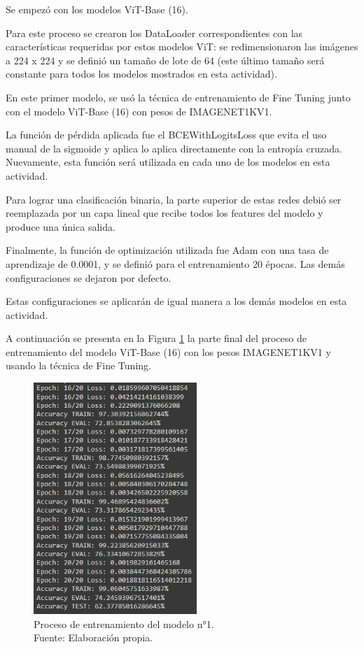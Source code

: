 Se empezó con los modelos ViT-Base (16).

Para este proceso se crearon los DataLoader correspondientes con las características requeridas por estos modelos ViT: se redimensionaron las imágenes a 224 x 224 y se definió un tamaño de lote de 64 (este último tamaño será constante para todos los modelos mostrados en esta actividad).

En este primer modelo, se usó la técnica de entrenamiento de Fine Tuning junto con el modelo ViT-Base (16) con pesos de IMAGENET1KV1.

La función de pérdida aplicada fue el BCEWithLogitsLoss que evita el uso manual de la sigmoide y aplica lo aplica directamente con la entropía cruzada. Nuevamente, esta función será utilizada en cada uno de los modelos en esta actividad.

Para lograr una clasificación binaria, la parte superior de estas redes debió ser reemplazada por un capa lineal que recibe todos los features del modelo y produce una única salida.

Finalmente, la función de optimización utilizada fue Adam con una tasa de aprendizaje de 0.0001, y se definió para el entrenamiento 20 épocas. Las demás configuraciones se dejaron por defecto.

Estas configuraciones se aplicarán de igual manera a los demás modelos en esta actividad.

A continuación se presenta en la Figura \ref{4:fig120} la parte final del proceso de entrenamiento del modelo ViT-Base (16) con los pesos IMAGENET1KV1 y usando la técnica de Fine Tuning.

\begin{figure}[H]
	\begin{center}
		\includegraphics[width=0.55\textwidth]{4/figures/model1_train.PNG}
		\caption[Proceso de entrenamiento del modelo n°1]{Proceso de entrenamiento del modelo n°1. \\
		Fuente: Elaboración propia.}
		\label{4:fig120}
	\end{center}
\end{figure}

